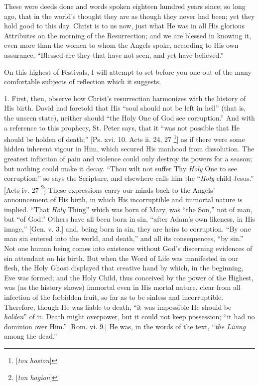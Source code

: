 These were deeds done and words spoken eighteen hundred years since;
so long ago, that in the world's thought they are as though they never
had been; yet they hold good to this day. Christ is to us now, just what
He was in all His glorious Attributes on the morning of the
Resurrection; and we are blessed in knowing it, even more than the women
to whom the Angels spoke, according to His own assurance, ``Blessed
are they that have not seen, and yet have believed.''

On this highest of Festivals, I will attempt to set before you one
out of the many comfortable subjects of reflection which it suggests.

1. First, then, observe how Christ's resurrection harmonizes with the
history of His birth. David had foretold that His ``soul should not
be left in hell'' (that is, the unseen state), neither should
``the Holy One of God see corruption.'' And with a reference to
this prophecy, St. Peter says, that it ``was not possible that He
should be holden of death;'' [Ps. xvi. 10. Acts ii. 24, 27 \footnote{[\emph{tou hosion}]}] as if there were some hidden inherent vigour in Him, which
secured His manhood from dissolution. The greatest infliction of pain
and violence could only destroy its powers for a season; but nothing
could make it decay. ``Thou wilt not suffer Thy \emph{Holy} One to
see corruption;'' so says the Scripture, and elsewhere calls him the
``\emph{Holy} child Jesus.'' [Acts iv. 27 \footnote{[\emph{ton hagion}]}] These expressions carry our minds back to the Angels'
announcement of His birth, in which His incorruptible and immortal
nature is implied. ``That \emph{Holy} Thing'' which was born of
Mary, was ``the Son,'' not of man, but ``of God.''
Others have all been born in sin, ``after Adam's own likeness, in
His image,'' [Gen. v. 3.] and, being born in sin, they are heirs to
corruption. ``By one man sin entered into the world, and
death,'' and all its consequences, ``by sin.'' Not one human
being comes into existence without God's discerning evidences of sin
attendant on his birth. But when the Word of Life was manifested in our
flesh, the Holy Ghost displayed that creative hand by which, in the
beginning, Eve was formed; and the Holy Child, thus conceived by the
power of the Highest, was (as the history shows) immortal even in His
mortal nature, clear from all infection of the forbidden fruit, so far
as to be sinless and incorruptible. Therefore, though He was liable to
death, ``it was impossible He should be \emph{holden}'' of it. Death
might overpower, but it could not keep possession; ``it had no
dominion over Him.'' [Rom. vi. 9.] He was, in the words of the text,
``\emph{the Living} among the dead.''


